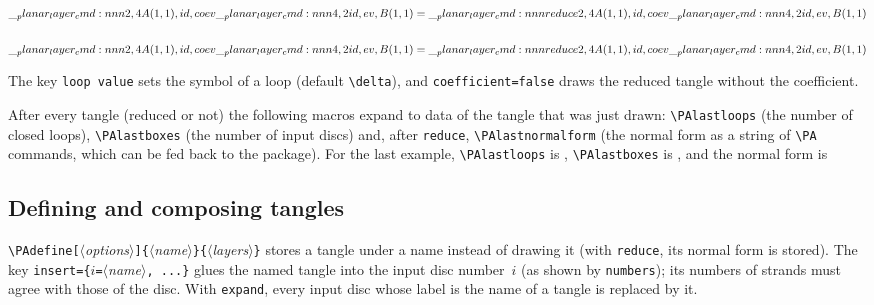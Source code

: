 \documentclass[11pt]{article}
\newenvironment{result}{\par\smallskip\noindent\hspace*{1em}}{\par\medskip}
\newcommand\opt[1]{\texttt{#1}}
\newcommand\cs[1]{\texttt{\textbackslash#1}}
\newcommand\meta[1]{\ensuremath{\langle}\textit{#1}\ensuremath{\rangle}}
\newcommand\marg[1]{\texttt{\{}\meta{#1}\texttt{\}}}
\newcommand\oarg[1]{\texttt{[}\meta{#1}\texttt{]}}
\begin{document}
\begin{code}
\[ \PA{2,4}{A(1,1), id, coev}\PA{4,2}{id, ev, B(1,1)}
   = \PA[reduce]{2,4}{A(1,1), id, coev}\PA{4,2}{id, ev, B(1,1)} \]
\end{code}
\begin{result}
  \( \PA{2,4}{A(1,1), id, coev}\PA{4,2}{id, ev, B(1,1)}
     = \PA[reduce]{2,4}{A(1,1), id, coev}\PA{4,2}{id, ev, B(1,1)} \)
\end{result}

The key \opt{loop value} sets the symbol of a loop (default \verb|\delta|),
and \opt{coefficient=false} draws the reduced tangle without the
coefficient.

\begin{code}
\end{code}
\begin{result}
\end{result}

After every tangle (reduced or not) the following macros expand to data of
the tangle that was just drawn: \cs{PAlastloops} (the number of closed
loops), \cs{PAlastboxes} (the number of input discs) and, after
\opt{reduce}, \cs{PAlastnormalform} (the normal form as a string of
\cs{PA} commands, which can be fed back to the package). For the last
example, \cs{PAlastloops} is \PAlastloops, \cs{PAlastboxes} is
\PAlastboxes, and the normal form is
\begin{center}\ttfamily\small\PAlastnormalform\end{center}

\subsection{Defining and composing tangles}

\cs{PAdefine}\oarg{options}\marg{name}\marg{layers} stores a tangle under a
name instead of drawing it (with \opt{reduce}, its normal form is stored).
The key \opt{insert}\verb|={|$i$\verb|=|\meta{name}\verb|, ...}| glues the
named tangle into the input disc number~$i$ (as shown by \opt{numbers}); its
numbers of strands must agree with those of the disc. With \opt{expand},
every input disc whose label is the name of a tangle is replaced by it.
\end{document}
